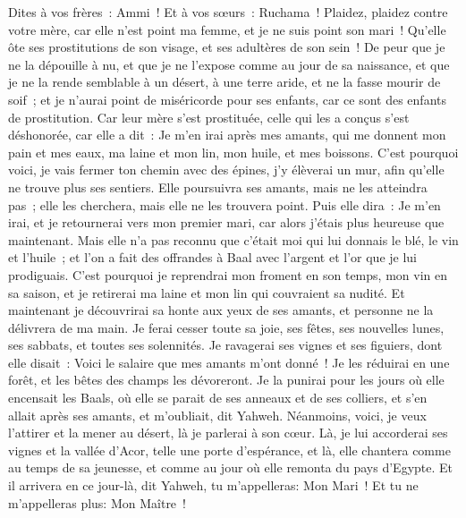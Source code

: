 \begin{multicols}{2}
Dites à vos frères~: Ammi~! Et à vos sœurs~: Ruchama~!
Plaidez, plaidez contre votre mère, car elle n'est point ma femme, et je ne suis point son mari~! Qu'elle ôte ses prostitutions de son visage, et ses adultères de son sein~!
De peur que je ne la dépouille à nu, et que je ne l'expose comme au jour de sa naissance, et que je ne la rende semblable à un désert, à une terre aride, et ne la fasse mourir de soif~;
et je n'aurai point de miséricorde pour ses enfants, car ce sont des enfants de prostitution.
Car leur mère s'est prostituée, celle qui les a conçus s'est déshonorée, car elle a dit~: Je m'en irai après mes amants, qui me donnent mon pain et mes eaux, ma laine et mon lin, mon huile, et mes boissons.
C'est pourquoi voici, je vais fermer ton chemin avec des épines, j'y élèverai un mur, afin qu'elle ne trouve plus ses sentiers.
Elle poursuivra ses amants, mais ne les atteindra pas~; elle les cherchera, mais elle ne les trouvera point. Puis elle dira~: Je m'en irai, et je retournerai vers mon premier mari, car alors j'étais plus heureuse que maintenant.
Mais elle n'a pas reconnu que c'était moi qui lui donnais le blé, le vin et l'huile~; et l'on a fait des offrandes à Baal avec l'argent et l'or que je lui prodiguais.
C'est pourquoi je reprendrai mon froment en son temps, mon vin en sa saison, et je retirerai ma laine et mon lin qui couvraient sa nudité.
Et maintenant je découvrirai sa honte aux yeux de ses amants, et personne ne la délivrera de ma main.
Je ferai cesser toute sa joie, ses fêtes, ses nouvelles lunes, ses sabbats, et toutes ses solennités.
Je ravagerai ses vignes et ses figuiers, dont elle disait~: Voici le salaire que mes amants m'ont donné~! Je les réduirai en une forêt, et les bêtes des champs les dévoreront.
Je la punirai pour les jours où elle encensait les Baals, où elle se parait de ses anneaux et de ses colliers, et s'en allait après ses amants, et m'oubliait, dit Yahweh.
Néanmoins, voici, je veux l'attirer et la mener au désert, là je parlerai à son cœur.
Là, je lui accorderai ses vignes et la vallée d'Acor, telle une porte d'espérance, et là, elle chantera comme au temps de sa jeunesse, et comme au jour où elle remonta du pays d'Egypte.
 Et il arrivera en ce jour-là, dit Yahweh, tu m'appelleras: Mon Mari~! Et tu ne m'appelleras plus: Mon Maître~!

\end{multicols}
